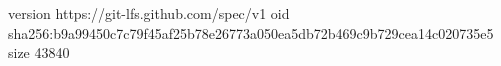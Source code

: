version https://git-lfs.github.com/spec/v1
oid sha256:b9a99450c7c79f45af25b78e26773a050ea5db72b469c9b729cea14c020735e5
size 43840
